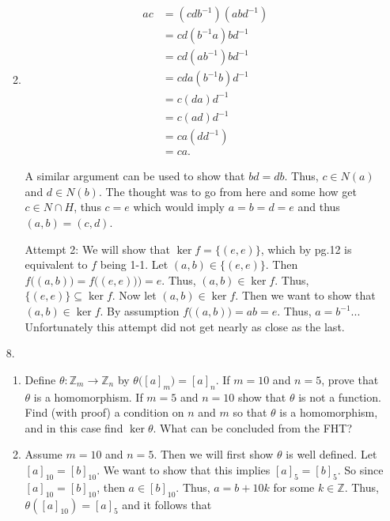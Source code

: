 \documentclass[12pt]{article}
\makeatletter
\theoremstyle{definition}
\theoremstyle{remark}
\renewenvironment{proof}[1][\proofname]{\par
  \pushQED{\qed}%
  \normalfont \topsep6\p@\@plus6\p@\relax
  \list{}{\leftmargin=0mm
          \rightmargin=0mm
          \settowidth{\itemindent}{\itshape#1}%
          \labelwidth=\itemindent
          \parsep=0pt \listparindent=\parindent 
  }
  \item[\hskip\labelsep
        \itshape
    #1\@addpunct{.}]\ignorespaces
}{%
  \popQED\endlist\@endpefalse
}
\let\oldproofname=\proofname
\renewcommand{\proofname}{\bf{\textit{\oldproofname}}}
\makeatother
\begin{document}
\begin{enumerate}[leftmargin=*]
\begin{enumerate}[label=\alph*)]
\begin{proof}
                        \begin{equation*}
                            \begin{split}
                                ac&=(cdb^{-1})(abd^{-1}) \\
                                &=cd(b^{-1}a)bd^{-1} \\
                                &=cd(ab^{-1})bd^{-1} \\
                                &=cda(b^{-1}b)d^{-1} \\
                                &=c(da)d^{-1} \\
                                &=c(ad)d^{-1} \\
                                &=ca(dd^{-1}) \\
                                &=ca.
                            \end{split}
                        \end{equation*}
                        
                        A similar argument can be used to show that $bd=db$. Thus, $c\in N(a)$ and $d\in N(b)$. The thought was to go from here and some how get $c\in N\cap H$, thus $c=e$ which would imply $a=b=d=e$ and thus $(a,b)=(c,d)$.\par\hspace{4mm} Attempt 2: We will show that $\ker f=\{(e,e)\}$, which by pg.12 is equivalent to $f$ being 1-1. Let $(a,b)\in\{(e,e)\}$. Then $f\big((a,b)\big)=f\big((e,e)\big))=e$. Thus, $(a,b)\in\ker f$. Thus, $\{(e,e)\}\subseteq\ker f$. Now let $(a,b)\in\ker f$. Then we want to show that $(a,b)\in\ker f$. By assumption $f\big((a,b)\big)=ab=e$. Thus, $a=b^{-1}$... Unfortunately this attempt did not get nearly as close as the last.
                    \end{proof}
            \end{enumerate}
            
        \item[8.]\hfill\par 
            \begin{enumerate}[label=\alph*)]
                \item Define $\theta\colon\mathbb{Z}_m\rightarrow\mathbb{Z}_n$ by $\theta\big([a]_m\big)=[a]_n$. If $m=10$ and $n=5$, prove that $\theta$ is a homomorphism. If $m=5$ and $n=10$ show that $\theta$ is not a function. Find (with proof) a condition on $n$ and $m$ so that $\theta$ is a homomorphism, and in this case find $\ker\theta$. What can be concluded from the FHT?
                    \begin{proof}
                        Assume $m=10$ and $n=5$. Then we will first show $\theta$ is well defined. Let $[a]_{10}=[b]_{10}$. We want to show that this implies $[a]_5=[b]_5$. So since $[a]_{10}=[b]_{10}$, then $a\in [b]_{10}$. Thus, $a=b+10k$ for some $k\in\mathbb{Z}$. Thus, $\theta([a]_{10})=[a]_5$ and it follows that 
                        

\end{proof}
\end{enumerate}
\end{enumerate}
\end{document}
